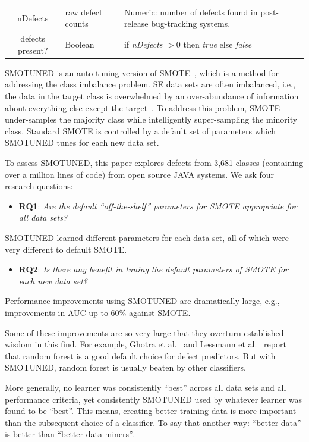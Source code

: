 \documentclass[sigconf,review, anonymous]{acmart}
\newcommand{\bi}{\begin{itemize}[leftmargin=0.4cm]}
\newcommand{\ei}{\end{itemize}}
\theoremstyle{break}
\theoremstyle{break}
\newcommand{\sma}{{\sc SMOTE}}
\newcommand{\smb}{{\sc SMOTUNED}}
\begin{document}
\begin{table}[!t]
\begin{center}
{\begin{tabular}{c|l|p{4.4in}}
nDefects & raw defect counts & Numeric: number of defects found in post-release bug-tracking systems.\\
\rowcolor{lightgray}
defects present? & Boolean& if {\em nDefects} $>0$ then {\em true} else {\em false}
\end{tabular}
}
\end{center}
\vspace{-0.2cm}
\end{table}


{\smb} is an auto-tuning version of  {\sma}~\cite{chawla2002smote}, which is
a method for addressing the class imbalance problem. SE data
sets are often imbalanced, i.e., the data in the target class is overwhelmed by an over-abundance of information about everything else except the target~\cite{menzies2007problems}. To
address this problem, {\sma} under-samples
the majority class while intelligently super-sampling  the minority class. Standard
{\sma} is controlled by a default
set of parameters which {\smb} tunes 
for each new data set. 

To assess {\smb}, this paper explores defects from  3,681	 classes (containing over a million lines of code) from open source JAVA systems. We ask four research questions: 
 \bi\item
  \textbf{RQ1}:  {\em Are the default ``off-the-shelf'' parameters for {\sma} appropriate for
  all data sets?} 
  \ei
 \begin{lesson}{\smb} learned different parameters for each data set, all of which  were very different to default {\sma}.
 \end{lesson}
  \bi
  \item
  \textbf{RQ2}: {\em   Is  there any benefit in tuning the default parameters of {\sma} for
  each new data set?} 
  \ei
   \begin{lesson}Performance improvements using {\smb} are dramatically large, e.g., improvements in AUC up to 60\% against {\sma}.
 \end{lesson}
Some of these improvements are so very large that they overturn established wisdom in this find.
For example,  Ghotra et al.~\cite{ghotra2015revisiting} and Lessmann et al.~\cite{lessmann2008benchmarking}
 report that   random forest is a  good default choice for  defect predictors.
But with  {\smb}, random forest is usually
beaten by other classifiers. 

More generally, no learner was consistently ``best'' across all data sets and all performance criteria, yet consistently {\smb} used by  whatever  learner was found to be ``best''.  
This means,  creating better training data is more important
than the subsequent choice of a classifier.  To say that another way: ``better data'' is better than ``better data miners''.
 
\end{document}
